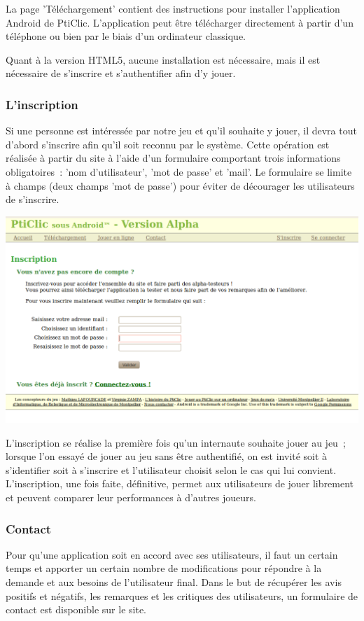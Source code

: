 \documentclass[a4paper,11pt,french]{article}
\begin{document}
La page 'Téléchargement' contient des instructions pour installer l'application Android de PtiClic. L'application peut être télécharger directement à partir d'un téléphone ou bien par le biais d'un ordinateur classique. 

Quant à la version HTML5, aucune installation est nécessaire, mais il est nécessaire de s'inscrire et s'authentifier afin d'y jouer. 

\subsubsection{L'inscription}
Si une personne est intéressée par notre jeu et qu'il souhaite y jouer, il devra tout d'abord s'inscrire afin qu'il
soit reconnu par le système. Cette opération est réalisée à partir du site à l'aide d'un formulaire comportant
trois informations obligatoires~: 'nom d'utilisateur', 'mot de passe' et 'mail'. Le formulaire se limite à champs (deux champs 'mot de passe') pour éviter de décourager les utilisateurs de s'inscrire.

\begin{center}
\includegraphics[width=14cm]{img/siteInscription.png}
\end{center}

L'inscription se réalise la première fois qu'un internaute souhaite jouer au jeu~; lorsque l'on essayé de jouer au jeu sans être authentifié, on est invité soit à s'identifier soit à s'inscrire et l'utilisateur choisit selon le cas qui lui convient. L'inscription, une fois faite, définitive, permet aux utilisateurs de jouer librement et peuvent comparer leur performances à d'autres joueurs.

\subsubsection{Contact}
Pour qu'une application soit en accord avec ses utilisateurs, il faut un certain temps et apporter un certain nombre
de modifications pour répondre à la demande et aux besoins de l'utilisateur final. Dans le but de récupérer les avis positifs et négatifs, les remarques et les critiques des utilisateurs, un formulaire de contact est disponible sur le site. 
\end{document}

